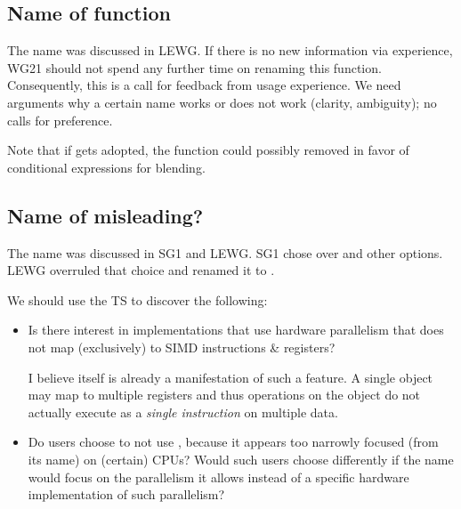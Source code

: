 \subsection{Name of  function} \ghfeedback
The name was discussed in LEWG.
If there is no new information via experience, WG21 should not spend any further time on renaming this function.
Consequently, this is a call for feedback from usage experience.
We need arguments why a certain name works or does not work (clarity, ambiguity); no calls for preference.

Note that if \textcite{P0917R2} gets adopted, the  function could possibly removed in favor of conditional expressions for blending.

\subsection{Name of \simdT misleading?} \ghfeedback
The name was discussed in SG1 and LEWG.
SG1 chose  over  and other options.
LEWG overruled that choice and renamed it to .

We should use the TS to discover the following:
\begin{itemize}
  \item Is there interest in implementations that use hardware parallelism that does not map (exclusively) to SIMD instructions \& registers?
    \begin{flushright}
      \smaller\color{gray}
      I believe  itself is already a manifestation of such a feature.
      A single  object may map to multiple registers and thus operations on the object do not actually execute as a \emph{single instruction} on multiple data.
    \end{flushright}
  \item Do users choose to not use , because it appears too narrowly focused (from its name) on (certain) CPUs?
    Would such users choose differently if the name would focus on the parallelism it allows instead of a specific hardware implementation of such parallelism?
\end{itemize}

